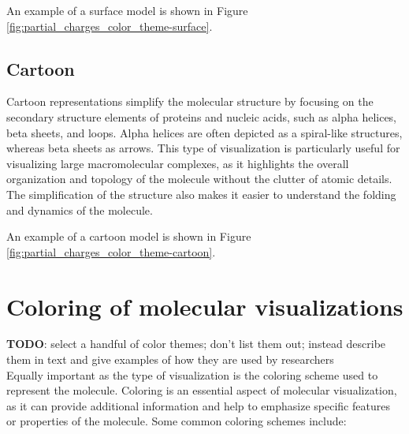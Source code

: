 \documentclass[
  digital,     %
  oneside,     %
  nosansbold,  %
  nocolorbold, %
  lof,         %
  lot,         %
]{fithesis4}
\begin{document}
An example of a surface model is shown in Figure \ref{fig:partial_charges_color_theme-surface}.

\subsection{Cartoon}
\label{subsection:cartoon}

Cartoon representations simplify the molecular structure by focusing on the secondary structure elements of proteins and nucleic acids, such as alpha helices, beta sheets, and loops. Alpha helices are often depicted as a spiral-like structures, whereas beta sheets as arrows. This type of visualization is particularly useful for visualizing large macromolecular complexes, as it highlights the overall organization and topology of the molecule without the clutter of atomic details. The simplification of the structure also makes it easier to understand the folding and dynamics of the molecule.

An example of a cartoon model is shown in Figure \ref{fig:partial_charges_color_theme-cartoon}.

\section{Coloring of molecular visualizations}
\label{subsection:coloring_of_molecular_visualizations}

\textbf{TODO}: select a handful of color themes; don't list them out; instead describe them in text and give examples of how they are used by researchers \\

Equally important as the type of visualization is the coloring scheme used to represent the molecule. Coloring is an essential aspect of molecular visualization, as it can provide additional information and help to emphasize specific features or properties of the molecule. Some common coloring schemes include:
\end{document}
